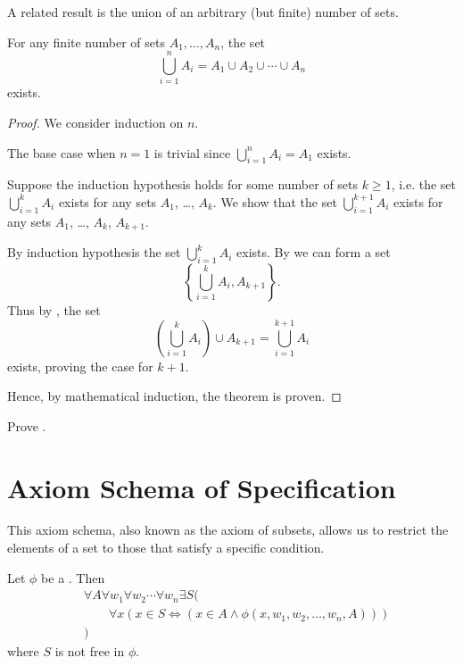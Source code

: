 A related result is the union of an arbitrary (but finite) number of sets.

\begin{theorem}\label{theorem:union-of-finite-number-of-sets-exists}
    For any finite number of sets $A_1, \dots, A_n$, the set
    \[
        \bigcup_{i=1}^n A_i = A_1 \cup A_2 \cup \cdots \cup A_n
    \]
    exists.
\end{theorem}
\begin{proof}
    We consider induction on $n$.

    The base case when $n = 1$ is trivial since $\bigcup_{i=1}^n A_i = A_1$ exists.

    Suppose the induction hypothesis holds for some number of sets $k \geq 1$, i.e. the set $\bigcup_{i=1}^k A_i$ exists for any sets $A_1$, \dots, $A_k$. We show that the set $\bigcup_{i=1}^{k+1} A_i$ exists for any sets $A_1$, \dots, $A_k$, $A_{k+1}$.              
    
    By induction hypothesis the set $\bigcup_{i=1}^k A_i$ exists. By  we can form a set
    \[
        \left\{\bigcup_{i=1}^k A_i, A_{k+1}\right\}.
    \]
    Thus by , the set
    \[
        \left(\bigcup_{i=1}^k A_i\right) \cup A_{k+1} = \bigcup_{i=1}^{k+1} A_i
    \]
    exists, proving the case for $k+1$.

    Hence, by mathematical induction, the theorem is proven.
\end{proof}


\begin{exercise}\label{exercise:set-of-any-list-of-items}
    Prove .
\end{exercise}

\section{Axiom Schema of Specification}  %
This axiom schema, also known as the axiom of subsets, allows us to restrict the elements of a set to those that satisfy a specific condition.

\begin{axiom}\label{axiom:schema-of-specification}
    Let $\phi$ be a \wff. Then
    \begin{align*}
        &\forall A \forall w_1 \forall w_2 \cdots \forall w_n \exists S(\\
        &\quad\quad\forall x \left(x \in S \iff (x \in A \land \phi(x, w_1, w_2, \dots, w_n, A))\right)\\
        &)
    \end{align*}
    where $S$ is not free in $\phi$.
\end{axiom}

